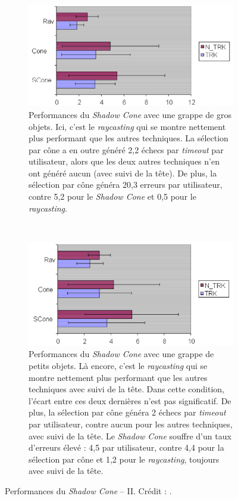 		
	\begin{figure}[!htb]
		\begin{subfigure}[t]{0.49\textwidth}
			\centering
			\includegraphics[width=\textwidth]{figures/ch2/shadowCLarge}
			\caption{Performances du \emph{Shadow Cone} avec une grappe de gros objets. Ici, c'est le \emph{raycasting} qui se montre nettement plus performant que les autres techniques. La sélection par cône a en outre généré 2,2 échecs par \emph{timeout} par utilisateur, alors que les deux autres techniques n'en ont généré aucun (avec suivi de la tête). De plus, la sélection par cône généra 20,3 erreurs par utilisateur, contre 5,2 pour le \emph{Shadow Cone} et 0,5 pour le \emph{raycasting}.}
			\label{fig:shadowCLarge}
		\end{subfigure}
		~
		\begin{subfigure}[t]{0.49\textwidth}
			\centering
			\includegraphics[width=\textwidth]{figures/ch2/shadowCSmall}
			\caption{Performances du \emph{Shadow Cone} avec une grappe de petits objets. Là encore, c'est le \emph{raycasting} qui se montre nettement plus performant que les autres techniques avec suivi de la tête. Dans cette condition, l'écart entre ces deux dernières n'est pas significatif. De plus, la sélection par cône généra 2 échecs par \emph{timeout} par utilisateur, contre aucun pour les autres techniques, avec suivi de la tête. Le \emph{Shadow Cone} souffre d'un taux d'erreurs élevé : 4,5 par utilisateur, contre 4,4 pour la sélection par cône et 1,2 pour le \emph{raycasting}, toujours avec suivi de la tête.}
			\label{fig:shadowCSmall}
		\end{subfigure}
		\caption[Performances du \emph{Shadow Cone} -- II]{Performances du \emph{Shadow Cone} -- II. Crédit : \cite{steed20043d}.}
		\label{fig:shadowConePerf3}
	\end{figure}
	
